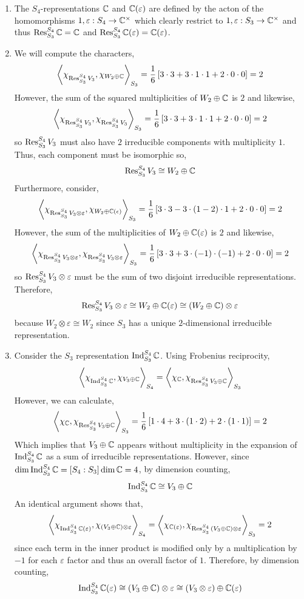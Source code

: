 \documentclass[12pt]{extarticle}
\begin{document}
\begin{enumerate}
\item The $S_4$-representations $\mathbb{C}$ and $\mathbb{C}(\varepsilon)$ are defined by the acton of the homomorphisms $1, \varepsilon : S_4 \to \mathbb{C}^\times$ which clearly restrict to $1, \varepsilon : S_3 \to \mathbb{C}^\times$ and thus $\mathrm{Res}^{S_4}_{S_3} \, \mathbb{C} = \mathbb{C}$ and $\mathrm{Res}^{S_4}_{S_3} \, \mathbb{C}(\varepsilon) = \mathbb{C}(\varepsilon)$.  

\item We will compute the characters,
\[ \left< \chi_{\mathrm{Res}^{S_4}_{S_3} \, V_3}, \chi_{W_2 \oplus \mathbb{C}} \right>_{S_3} = \frac{1}{6} \left[ 3 \cdot 3 + 3 \cdot 1 \cdot 1 + 2 \cdot 0 \cdot 0 \right]  = 2 \]
However, the sum of the squared multiplicities of $W_2 \oplus \mathbb{C}$ is $2$ and likewise,
\[ \left< \chi_{\mathrm{Res}^{S_4}_{S_3} \, V_3}, \chi_{\mathrm{Res}^{S_4}_{S_3} \, V_3} \right>_{S_3} = \frac{1}{6} \left[ 3 \cdot 3 + 3 \cdot 1 \cdot 1 + 2 \cdot 0 \cdot 0 \right]  = 2 \]
so $\mathrm{Res}^{S_4}_{S_3} \, V_3$ must also have $2$ irreducible components with multiplicity $1$. Thus, each component must be isomorphic so,
\[ \mathrm{Res}^{S_4}_{S_3} \, V_3 \cong W_2 \oplus \mathbb{C} \]
Furthermore, consider,
\[ \left< \chi_{\mathrm{Res}^{S_4}_{S_3} \, V_3 \otimes \varepsilon}, \chi_{W_2 \oplus \mathbb{C}(\epsilon)} \right>_{S_3} = \frac{1}{6} \left[ 3 \cdot 3 - 3 \cdot (1-2) \cdot 1 + 2 \cdot 0 \cdot 0 \right]  = 2 \]
However, the sum of the multiplicities of $W_2 \oplus \mathbb{C}(\varepsilon)$ is $2$ and likewise,
\[ \left< \chi_{\mathrm{Res}^{S_4}_{S_3} \, V_3 \otimes \varepsilon}, \chi_{\mathrm{Res}^{S_4}_{S_3} \, V_3  \otimes \varepsilon} \right>_{S_3} = \frac{1}{6} \left[ 3 \cdot 3 + 3 \cdot (-1) \cdot (-1) + 2 \cdot 0 \cdot 0 \right]  = 2 \] 
so $\mathrm{Res}^{S_4}_{S_3} \, V_3 \otimes \varepsilon$ must be the sum of two disjoint irreducible representations. Therefore, 
\[ \mathrm{Res}^{S_4}_{S_3} \, V_3 \otimes \varepsilon \cong W_2 \oplus \mathbb{C}(\varepsilon) \cong (W_2 \oplus \mathbb{C} ) \otimes \varepsilon \]
because $W_2 \otimes \varepsilon \cong W_2$ since $S_3$ has a unique $2$-dimensional irreducible representation.

\item Consider the $S_3$ representation $\mathrm{Ind}^{S_4}_{S_3} \, \mathbb{C}$. Using Frobenius reciprocity,
\[ \left< \chi_{\mathrm{Ind}^{S_4}_{S_3} \, \mathbb{C}}, \chi_{V_3 \oplus \mathbb{C}} \right>_{S_4} = \left< \chi_{\mathbb{C}}, \chi_{\mathrm{Res}^{S_4}_{S_3} \, V_3 \oplus \mathbb{C}} \right>_{S_3} \] 
However, we can calculate,
\[
\left< \chi_{\mathbb{C}}, \chi_{\mathrm{Res}^{S_4}_{S_3} \, V_3 \oplus \mathbb{C}} \right>_{S_3} = \frac{1}{6} \left[ 1 \cdot 4 + 3 \cdot (1 \cdot 2 ) + 2 \cdot (1 \cdot 1) \right] = 2 \]
Which implies that $V_3 \oplus \mathbb{C}$ appears without multiplicity in the expansion of $\mathrm{Ind}^{S_4}_{S_3} \, \mathbb{C}$ as a sum of irreducible representations. However, since $\dim{\mathrm{Ind}^{S_4}_{S_3} \, \mathbb{C}} = [S_4 : S_3] \dim{\mathbb{C}} = 4$, by dimension counting,
\[ \mathrm{Ind}^{S_4}_{S_3} \, \mathbb{C} \cong V_3 \oplus \mathbb{C} \]
An identical argument shows that,
\[ \left< \chi_{\mathrm{Ind}^{S_4}_{S_3} \, \mathbb{C}(\varepsilon)}, \chi_{(V_3 \oplus \mathbb{C}) \otimes \varepsilon} \right>_{S_4} = \left< \chi_{\mathbb{C}(\varepsilon)}, \chi_{\mathrm{Res}^{S_4}_{S_3} \, (V_3 \oplus \mathbb{C}) \otimes \varepsilon} \right>_{S_3} = 2\]
since each term in the inner product is modified only by a multiplication by $-1$ for each $\varepsilon$ factor and thus an overall factor of $1$. Therefore, by dimension counting,
\[ \mathrm{Ind}^{S_4}_{S_3} \, \mathbb{C}(\varepsilon) \cong (V_3 \oplus \mathbb{C}) \otimes \varepsilon \cong (V_3 \otimes \varepsilon) \oplus \mathbb{C}(\varepsilon) \]  


\end{enumerate}
\end{document}
